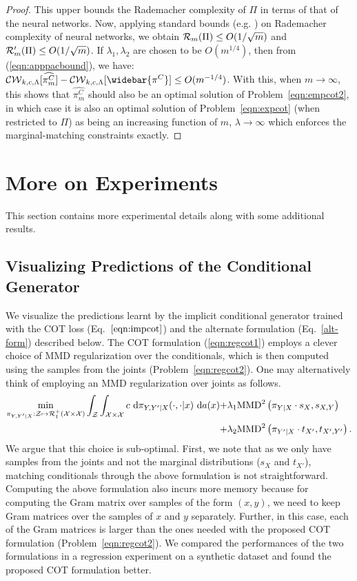 \begin{proof}
This upper bounds the Rademacher complexity of $\Pi$ in terms of that of the neural networks. Now, applying standard bounds (e.g. \citet[Sec. (5)]{neyshabur2017implicit}) on Rademacher complexity of neural networks, we obtain $\mathcal{R}_m(\Pi)\le O(1/\sqrt{m})$ and $\mathcal{R}'_m(\Pi)\le O(1/\sqrt{m})$. If $\lambda_1,\lambda_2$ are chosen to be $O(m^{1/4})$, then from (\ref{eqn:apppacbound}), we have: $\calCW[\widehat{\pi^C_m}]-\calCW[\widebar{\pi^C}]\leq O(m^{-1/4})$. With this, when $m\rightarrow\infty$, this shows that $\widehat{\pi^C_m}$ should also be an optimal solution of Problem~\ref{eqn:empcot2}, in which case it is also an optimal solution of Problem~\ref{eqn:expcot} (when restricted to $\Pi$) as being an increasing function of $m$, $\lambda\rightarrow\infty$ which enforces the marginal-matching constraints exactly.
\end{proof}


\resumetoc
\section{More on Experiments}
\stoptoc
This section contains more experimental details along with some additional results.
\subsection{Visualizing Predictions of the Conditional Generator}\label{app-regression}
We visualize the predictions learnt by the implicit conditional generator trained with the COT loss (Eq.~$\ref{eqn:impcot}$) and the alternate formulation (Eq.~\ref{alt-form}) described below. The COT formulation (\ref{eqn:regcot1}) employs a clever choice of MMD regularization over the conditionals, which is then computed using the samples from the joints (Problem~\ref{eqn:regcot2}). One may alternatively think of employing an MMD regularization over joints as follows.
\begin{align}\label{alt-form}
\min_{\pi_{Y,Y'|X}:\mathcal{Z}\mapsto\mathcal{R}_1^+(\mathcal{X}\times\mathcal{X})}\int_{\mathcal{Z}}\int_{\mathcal{X}\times\mathcal{X}} c\ \textup{d}\pi_{Y,Y'|X}(\cdot, \cdot|x)\ \textup{d}a(x) + &\lambda_1\textup{MMD}^2\left(\pi_{Y|X}\cdot s_X, s_{X,Y}\right)\nonumber\\
+&\lambda_2\textup{MMD}^2\left(\pi_{Y'|X}\cdot t_{X'}, t_{X', Y'}\right).
\end{align}
We argue that this choice is sub-optimal. First, we note that as we only have samples from the joints and not the marginal distributions ($s_X$ and $t_{X'}$), matching conditionals through the above formulation is not straightforward. Computing the above formulation also incurs more memory because for computing the Gram matrix over samples of the form $(x, y)$, we need to keep Gram matrices over the samples of $x$ and $y$ separately. Further, in this case, each of the Gram matrices is larger than the ones needed with the proposed COT formulation (Problem~\ref{eqn:regcot2}). We compared the performances of the two formulations in a regression experiment on a synthetic dataset and found the proposed COT formulation better. 

